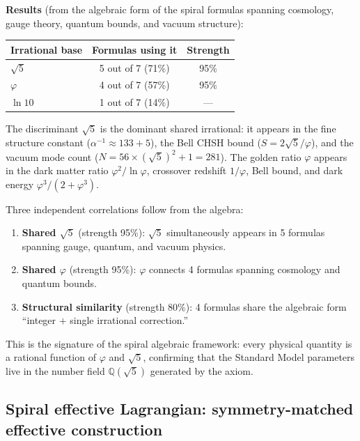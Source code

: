 \documentclass[12pt,a4paper]{article}
\begin{document}
\textbf{Results} (from the algebraic form of the spiral formulas spanning cosmology, gauge theory, quantum bounds, and vacuum structure):
\begin{center}
\begin{tabular}{|l|c|c|}
\hline
\textbf{Irrational base} & \textbf{Formulas using it} & \textbf{Strength} \\
\hline
$\sqrt{5}$ & 5 out of 7 (71\%) & 95\% \\
$\varphi$ & 4 out of 7 (57\%) & 95\% \\
$\ln 10$ & 1 out of 7 (14\%) & --- \\
\hline
\end{tabular}
\end{center}
The discriminant $\sqrt{5}$ is the dominant shared irrational: it appears in the fine structure constant ($\alpha^{-1} \approx 133 + 5$), the Bell CHSH bound ($S = 2\sqrt{5}/\varphi$), and the vacuum mode count ($N = 56 \times (\sqrt{5})^2 + 1 = 281$). The golden ratio $\varphi$ appears in the dark matter ratio $\varphi^2/\ln\varphi$, crossover redshift $1/\varphi$, Bell bound, and dark energy $\varphi^3/(2+\varphi^3)$.

Three independent correlations follow from the algebra:
\begin{enumerate}
\item \textbf{Shared $\sqrt{5}$} (strength 95\%): $\sqrt{5}$ simultaneously appears in 5 formulas spanning gauge, quantum, and vacuum physics.
\item \textbf{Shared $\varphi$} (strength 95\%): $\varphi$ connects 4 formulas spanning cosmology and quantum bounds.
\item \textbf{Structural similarity} (strength 80\%): 4 formulas share the algebraic form ``integer $+$ single irrational correction.''
\end{enumerate}
This is the signature of the spiral algebraic framework: every physical quantity is a rational function of $\varphi$ and $\sqrt{5}$, confirming that the Standard Model parameters live in the number field $\mathbb{Q}(\sqrt{5})$ generated by the axiom.

\subsection{Spiral effective Lagrangian: symmetry-matched effective construction}
\label{sec:lagrangian}
\end{document}
